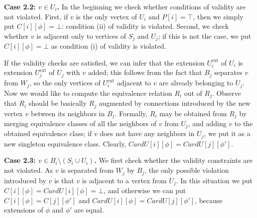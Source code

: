 \documentclass[a4paper,11pt]{article}
\theoremstyle{definition}
\theoremstyle{remark}
\newcommand{\ext}{\textrm{ext}}
\newcommand{\true}{\top}
\begin{document}
\vskip 0.1cm {\bf{Case 2.2: $v\in U_i$.}} In the beginning we check
whether conditions of validity are not violated.  First, if $v$ is the
only vertex of $U_i$ and $P[i]=\true$, then we simply put
$C[i][\phi]=\bot$: condition (ii) of validity is violated.  Second, we
check whether $v$ is adjacent only to vertices of $S_j$ and $U_j$; if
this is not the case, we put $C[i][\phi]=\bot$ as condition (i) of
validity is violated.

If the validity checks are satisfied, we can infer that the extension
$U^{\ext}_i$ of $U_i$ is extension $U^{\ext}_j$ of $U_j$ with $v$
added; this follows from the fact that $B_j$ separates $v$ from $W_j$,
so the only vertices of $U^{\ext}_i$ adjacent to $v$ are already
belonging to $U_j$.  Now we would like to compute the equivalence
relation $R_i$ out of $R_j$.  Observe that $R_i$ should be basically
$R_j$ augmented by connections introduced by the new vertex $v$
between its neighbors in $B_j$.  Formally, $R_i$ may be obtained from
$R_j$ by merging equivalence classes of all the neighbors of $v$ from
$U_j$, and adding $v$ to the obtained equivalence class; if $v$ does
not have any neighbors in $U_j$, we put it as a new singleton
equivalence class.  Clearly, $CardU[i][\phi]=CardU[j][\phi']$.

\vskip 0.1cm

{\bf{Case 2.3: $v\in B_i\setminus (S_i\cup U_i)$.}} We first check whether the
validity constraints are not violated.  As $v$ is separated from $W_j$
by $B_j$, the only possible violation introduced by $v$ is that $v$ is
adjacent to a vertex from $U_j$.  In this situation we put
$C[i][\phi]=CardU[i][\phi]=\bot$, and otherwise we can put
$C[i][\phi]=C[j][\phi']$ and $CardU[i][\phi]=CardU[j][\phi']$, because
extensions of $\phi$ and $\phi'$ are equal.

\vskip 0.3cm
\end{document}
